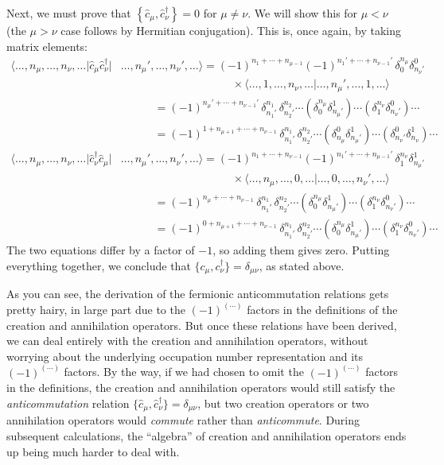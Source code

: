 \documentclass[pra,12pt]{revtex4}
\begin{document}
Next, we must prove that $\left\{ \hat{c}_\mu,
\hat{c}_\nu^\dagger\right\} = 0$ for $\mu \ne \nu$.  We will show this
for $\mu < \nu$ (the $\mu > \nu$ case follows by Hermitian
conjugation).  This is, once again, by taking matrix elements:
$$\begin{aligned}\big\langle \dots,n_\mu,\dots, n_\nu,\dots \big| \hat{c}_\mu \hat{c}_\nu^\dagger \big| & \dots, n_\mu', \dots, n_\nu',\dots\big\rangle = (-1)^{n_1+\cdots+n_{\mu-1}} (-1)^{n_1'+\cdots+n_{\nu-1}'} \,\delta^{n_\mu}_0 \delta^0_{n_\nu'} \\ &\qquad\qquad\qquad\qquad\qquad\times \big\langle \dots, 1, \dots, n_\nu,\dots\big| \dots,n_{\mu}', \dots,1, \dots \big\rangle \\ &\qquad\quad = (-1)^{n_\mu'+\cdots+n_{\nu-1}'}\, \delta^{n_1}_{n_1'} \, \delta^{n_2}_{n_2'} \cdots \left(\delta^{n_\mu}_0\delta^1_{n_\mu'}\right) \cdots \left(\delta^{n_\nu}_1 \delta^0_{n_\nu'}\right) \cdots \\
&\qquad\quad = (-1)^{1 + n_{\mu+1} + \cdots+n_{\nu-1}}\, \delta^{n_1}_{n_1'} \, \delta^{n_2}_{n_2'} \cdots \left(\delta^0_{n_\mu}\delta^1_{n_\mu'}\right) \cdots \left(\delta^0_{n_\nu'} \delta^1_{n_\nu}\right) \cdots \\
  \big\langle \dots,n_\mu,\dots, n_\nu,\dots \big| \hat{c}_\nu^\dagger \hat{c}_\mu \big| &\dots, n_\mu', \dots, n_\nu',\dots\big\rangle = (-1)^{n_1+\cdots+n_{\nu-1}} (-1)^{n_1'+\cdots+n_{\mu-1}'} \,\delta^{n_\nu}_1 \delta^1_{n_\mu'} \\ &\qquad\qquad\qquad\qquad\qquad\times \big\langle \dots, n_\mu, \dots, 0,\dots\big| \dots,0, \dots,n_\nu', \dots \big\rangle \\ &\qquad\quad= (-1)^{n_{\mu}+\cdots+n_{\nu-1}}\, \delta^{n_1}_{n_1'} \, \delta^{n_2}_{n_2'} \cdots \left(\delta^{n_\mu}_0\delta^1_{n_\mu'}\right) \cdots \left(\delta^{n_\nu}_1 \delta^0_{n_\nu'} \right) \cdots \\ &\qquad\quad= (-1)^{0 + n_{\mu+1}+\cdots+n_{\nu-1}}\, \delta^{n_1}_{n_1'} \, \delta^{n_2}_{n_2'} \cdots \left(\delta^{n_\mu}_0\delta^1_{n_\mu'}\right) \cdots \left(\delta^{n_\nu}_1\delta^0_{n_\nu'}\right) \cdots
\end{aligned}$$
The two equations differ by a factor of $-1$, so adding them gives
zero.  Putting everything together, we conclude that
$\big\{c_\mu,c_\nu^\dagger\big\} = \delta_{\mu\nu}$, as stated above.

As you can see, the derivation of the fermionic anticommutation
relations gets pretty hairy, in large part due to the
$(-1)^{(\cdots)}$ factors in the definitions of the creation and
annihilation operators.  But once these relations have been derived,
we can deal entirely with the creation and annihilation operators,
without worrying about the underlying occupation number representation
and its $(-1)^{(\cdots)}$ factors.  By the way, if we had chosen to
omit the $(-1)^{(\cdots)}$ factors in the definitions, the creation
and annihilation operators would still satisfy the
\textit{anticommutation} relation
$\{\hat{c}_\mu,\hat{c}_\nu^\dagger\}=\delta_{\mu\nu}$, but two
creation operators or two annihilation operators would
\textit{commute} rather than \textit{anticommute}.  During subsequent
calculations, the ``algebra'' of creation and annihilation operators
ends up being much harder to deal with.
\end{document}
